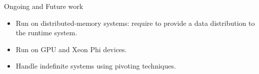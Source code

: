\documentclass{beamer}
\newcommand{\db}[1]{\textcolor{mblue}{#1\xspace}}
\begin{document}
\begin{frame}{Ongoing and Future work}

  \begin{itemize}
  \item Run on \alert{distributed-memory} systems: require to provide
    a data distribution to the runtime system.

    \vspace{0.4cm}

  \item Run on \db{GPU} and \db{Xeon Phi} devices.

    \vspace{0.4cm}

  \item Handle \alert{indefinite} systems using pivoting techniques.
  \end{itemize}

\end{frame}
\end{document}
